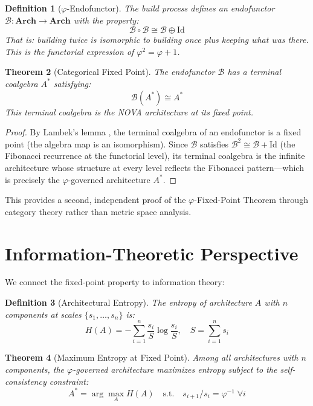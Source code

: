 \documentclass[12pt]{article}
\newtheorem{theorem}{Theorem}
\newtheorem{definition}[theorem]{Definition}
\newcommand{\PHI}{\varphi}
\newcommand{\PHIINV}{\varphi^{-1}}
\newcommand{\Build}{\mathcal{B}}
\begin{document}
\begin{definition}[$\PHI$-Endofunctor]
The build process defines an endofunctor $\Build: \mathbf{Arch} \to \mathbf{Arch}$ with the property:
\[
\Build \circ \Build \cong \Build \oplus \text{Id}
\]
That is: building twice is isomorphic to building once plus keeping what was there. This is the functorial expression of $\PHI^2 = \PHI + 1$.
\end{definition}

\begin{theorem}[Categorical Fixed Point]
The endofunctor $\Build$ has a terminal coalgebra $A^*$ satisfying:
\[
\Build(A^*) \cong A^*
\]
This terminal coalgebra is the NOVA architecture at its fixed point.
\end{theorem}

\begin{proof}
By Lambek's lemma \cite{lambek1968fixpoint}, the terminal coalgebra of an endofunctor is a fixed point (the algebra map is an isomorphism). Since $\Build$ satisfies $\Build^2 \cong \Build + \text{Id}$ (the Fibonacci recurrence at the functorial level), its terminal coalgebra is the infinite architecture whose structure at every level reflects the Fibonacci pattern—which is precisely the $\PHI$-governed architecture $A^*$.
\end{proof}

This provides a second, independent proof of the $\PHI$-Fixed-Point Theorem through category theory rather than metric space analysis.

\section{Information-Theoretic Perspective}

We connect the fixed-point property to information theory:

\begin{definition}[Architectural Entropy]
The entropy of architecture $A$ with $n$ components at scales $\{s_1, \ldots, s_n\}$ is:
\[
H(A) = -\sum_{i=1}^n \frac{s_i}{S} \log \frac{s_i}{S}, \quad S = \sum_{i=1}^n s_i
\]
\end{definition}

\begin{theorem}[Maximum Entropy at Fixed Point]
Among all architectures with $n$ components, the $\PHI$-governed architecture maximizes entropy subject to the self-consistency constraint:
\[
A^* = \arg\max_A H(A) \quad \text{s.t.} \quad s_{i+1}/s_i = \PHIINV \;\forall i
\]
\end{theorem}
\end{document}
